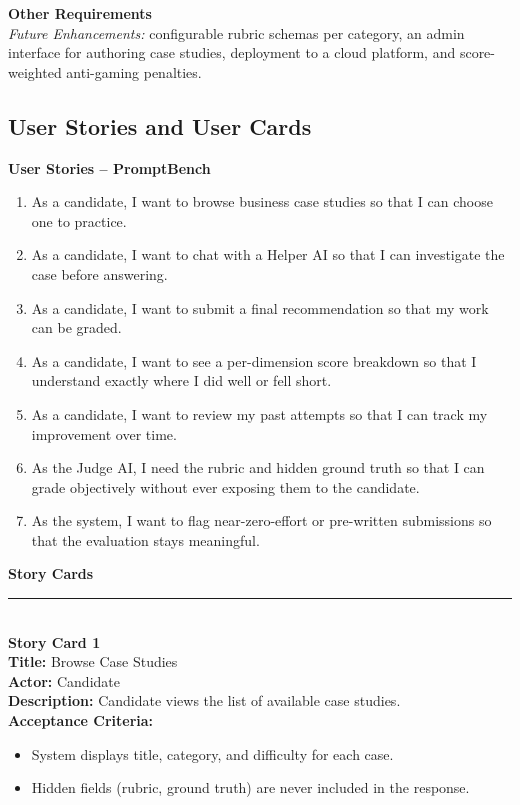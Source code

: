 \documentclass[11pt]{article}
\begin{document}
\textbf{Other Requirements}\\
\textit{Future Enhancements:} configurable rubric schemas per category, an admin interface for
authoring case studies, deployment to a cloud platform, and score-weighted anti-gaming
penalties.

\newpage
\subsection{User Stories and User Cards}

\textbf{User Stories -- PromptBench}
\begin{enumerate}[nosep]
  \item As a candidate, I want to browse business case studies so that I can choose one to practice.
  \item As a candidate, I want to chat with a Helper AI so that I can investigate the case before answering.
  \item As a candidate, I want to submit a final recommendation so that my work can be graded.
  \item As a candidate, I want to see a per-dimension score breakdown so that I understand exactly where I did well or fell short.
  \item As a candidate, I want to review my past attempts so that I can track my improvement over time.
  \item As the Judge AI, I need the rubric and hidden ground truth so that I can grade objectively without ever exposing them to the candidate.
  \item As the system, I want to flag near-zero-effort or pre-written submissions so that the evaluation stays meaningful.
\end{enumerate}

\textbf{Story Cards}

\noindent\rule{\linewidth}{0.5pt}\\
\textbf{Story Card 1}\\
\textbf{Title:} Browse Case Studies\\
\textbf{Actor:} Candidate\\
\textbf{Description:} Candidate views the list of available case studies.\\
\textbf{Acceptance Criteria:}
\begin{itemize}[nosep]
  \item System displays title, category, and difficulty for each case.
  \item Hidden fields (rubric, ground truth) are never included in the response.
\end{itemize}
\end{document}
